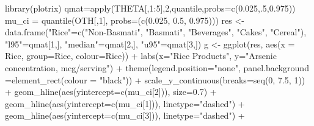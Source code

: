 \documentclass[]{article}
\newenvironment{Shaded}{\begin{snugshade}}{\end{snugshade}}
\newcommand{\KeywordTok}[1]{\textcolor[rgb]{0.94,0.87,0.69}{{#1}}}
\newcommand{\DataTypeTok}[1]{\textcolor[rgb]{0.87,0.87,0.75}{{#1}}}
\newcommand{\DecValTok}[1]{\textcolor[rgb]{0.86,0.86,0.80}{{#1}}}
\newcommand{\FloatTok}[1]{\textcolor[rgb]{0.75,0.75,0.82}{{#1}}}
\newcommand{\StringTok}[1]{\textcolor[rgb]{0.80,0.58,0.58}{{#1}}}
\newcommand{\NormalTok}[1]{\textcolor[rgb]{0.80,0.80,0.80}{{#1}}}
\begin{document}
\begin{Shaded}
\begin{Highlighting}[]
\KeywordTok{library}\NormalTok{(plotrix)}
\NormalTok{qmat=}\KeywordTok{apply}\NormalTok{(THETA[,}\DecValTok{1}\NormalTok{:}\DecValTok{5}\NormalTok{],}\DecValTok{2}\NormalTok{,quantile,}\DataTypeTok{probs=}\KeywordTok{c}\NormalTok{(}\FloatTok{0.025}\NormalTok{,.}\DecValTok{5}\NormalTok{,}\FloatTok{0.975}\NormalTok{))}
\NormalTok{mu_ci =}\StringTok{ }\KeywordTok{quantile}\NormalTok{(OTH[,}\DecValTok{1}\NormalTok{], }\DataTypeTok{probs=}\NormalTok{(}\KeywordTok{c}\NormalTok{(}\FloatTok{0.025}\NormalTok{, }\FloatTok{0.5}\NormalTok{, }\FloatTok{0.975}\NormalTok{)))}
\NormalTok{res <-}\StringTok{ }\KeywordTok{data.frame}\NormalTok{(}\StringTok{"Rice"}\NormalTok{=}\KeywordTok{c}\NormalTok{(}\StringTok{"Non-Basmati"}\NormalTok{, }\StringTok{"Basmati"}\NormalTok{, }\StringTok{"Beverages"}\NormalTok{, }\StringTok{"Cakes"}\NormalTok{, }\StringTok{"Cereal"}\NormalTok{),}
                         \StringTok{"l95"}\NormalTok{=qmat[}\DecValTok{1}\NormalTok{,], }\StringTok{"median"}\NormalTok{=qmat[}\DecValTok{2}\NormalTok{,], }\StringTok{"u95"}\NormalTok{=qmat[}\DecValTok{3}\NormalTok{,])}
\NormalTok{g <-}\StringTok{ }\KeywordTok{ggplot}\NormalTok{(res, }\KeywordTok{aes}\NormalTok{(}\DataTypeTok{x =} \NormalTok{Rice, }\DataTypeTok{group=}\NormalTok{Rice, }\DataTypeTok{colour=}\NormalTok{Rice)) +}\StringTok{ }
\StringTok{  }\KeywordTok{labs}\NormalTok{(}\DataTypeTok{x=}\StringTok{"Rice Products"}\NormalTok{, }\DataTypeTok{y=}\StringTok{"Arsenic concentration, mcg/serving"}\NormalTok{) +}\StringTok{ }
\StringTok{  }\KeywordTok{theme}\NormalTok{(}\DataTypeTok{legend.position=}\StringTok{"none"}\NormalTok{, }\DataTypeTok{panel.background =}\KeywordTok{element_rect}\NormalTok{(}\DataTypeTok{colour =} \StringTok{"black"}\NormalTok{)) +}
\StringTok{  }\KeywordTok{scale_y_continuous}\NormalTok{(}\DataTypeTok{breaks=}\KeywordTok{seq}\NormalTok{(}\DecValTok{0}\NormalTok{, }\FloatTok{7.5}\NormalTok{, }\DecValTok{1}\NormalTok{)) +}
\StringTok{  }\KeywordTok{geom_hline}\NormalTok{(}\KeywordTok{aes}\NormalTok{(}\DataTypeTok{yintercept=}\KeywordTok{c}\NormalTok{(mu_ci[}\DecValTok{2}\NormalTok{])), }\DataTypeTok{size=}\FloatTok{0.7}\NormalTok{) +}
\StringTok{  }\KeywordTok{geom_hline}\NormalTok{(}\KeywordTok{aes}\NormalTok{(}\DataTypeTok{yintercept=}\KeywordTok{c}\NormalTok{(mu_ci[}\DecValTok{1}\NormalTok{])), }\DataTypeTok{linetype=}\StringTok{"dashed"}\NormalTok{) +}
\StringTok{  }\KeywordTok{geom_hline}\NormalTok{(}\KeywordTok{aes}\NormalTok{(}\DataTypeTok{yintercept=}\KeywordTok{c}\NormalTok{(mu_ci[}\DecValTok{3}\NormalTok{])), }\DataTypeTok{linetype=}\StringTok{"dashed"}\NormalTok{) +}

\end{Highlighting}
\end{Shaded}
\end{document}
